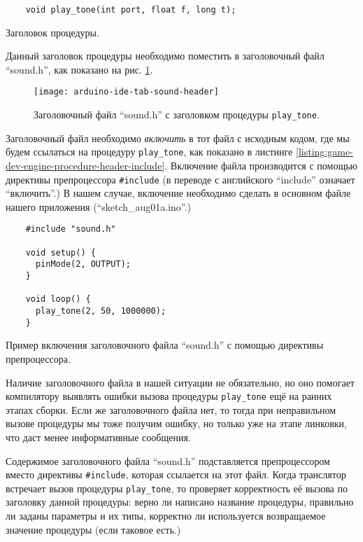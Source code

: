 \documentclass[../sparc.tex]{subfiles}
\begin{document}
\begin{listing}[H]
  \begin{verbatim}
    void play_tone(int port, float f, long t);
  \end{verbatim}
  \label{listing:game-dev-engine-procedure-header}
  \caption{Заголовок процедуры.}
\end{listing}

Данный заголовок процедуры необходимо поместить в заголовочный файл ``sound.h'',
как показано на рис. \ref{fig:arduino-ide-tab-sound-header}.

\begin{figure}[h]
  \centering
  \texttt{[image: arduino-ide-tab-sound-header]}
  \caption{Заголовочный файл ``sound.h'' с заголовком процедуры
    \texttt{play_tone}.}
  \label{fig:arduino-ide-tab-sound-header}
\end{figure}

Заголовочный файл необходимо \emph{включить} в тот файл с исходным кодом, где мы
будем ссылаться на процедуру \texttt{play_tone}, как показано в
листинге \ref{listing:game-dev-engine-procedure-header-include}.  Включение
файла производится с помощью директивы препроцессора \texttt{#include}
(в переводе с английского ``include'' означает ``включить''.)  В нашем случае,
включение необходимо сделать в основном файле нашего приложения
(``sketch\_aug01a.ino''.)

\begin{listing}[H]
  \begin{verbatim}
    #include "sound.h"

    void setup() {
      pinMode(2, OUTPUT);
    }

    void loop() {
      play_tone(2, 50, 1000000);
    }
  \end{verbatim}
  \label{listing:game-dev-engine-procedure-header-include}
  \caption{Пример включения заголовочного файла ``sound.h'' с помощью директивы
    препроцессора.}
\end{listing}

Наличие заголовочного файла в нашей ситуации не обязательно, но оно помогает
компилятору выявлять ошибки вызова процедуры \texttt{play_tone} ещё на
ранних этапах сборки.  Если же заголовочного файла нет, то тогда при
неправильном вызове процедуры мы тоже получим ошибку, но только уже на этапе
линковки, что даст менее информативные сообщения.

Содержимое заголовочного файла ``sound.h'' подставляется препроцессором вместо
директивы \texttt{#include}, которая ссылается на этот файл.  Когда
транслятор встречает вызов процедуры \texttt{play_tone}, то проверяет
корректность её вызова по заголовку данной процедуры: верно ли написано название
процедуры, правильно ли заданы параметры и их типы, корректно ли используется
возвращаемое значение процедуры (если таковое есть.)
\end{document}
